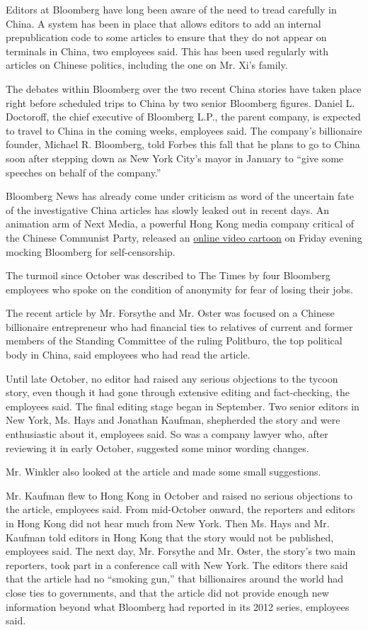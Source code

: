Editors at Bloomberg have long been aware of the need to tread carefully
in China. A system has been in place that allows editors to add an
internal prepublication code to some articles to ensure that they do not
appear on terminals in China, two employees said. This has been used
regularly with articles on Chinese politics, including the one on Mr.
Xi's family.

The debates within Bloomberg over the two recent China stories have
taken place right before scheduled trips to China by two senior
Bloomberg figures. Daniel L. Doctoroff, the chief executive of Bloomberg
L.P., the parent company, is expected to travel to China in the coming
weeks, employees said. The company's billionaire founder, Michael R.
Bloomberg, told Forbes this fall that he plans to go to China soon after
stepping down as New York City's mayor in January to ``give some
speeches on behalf of the company.''

Bloomberg News has already come under criticism as word of the uncertain
fate of the investigative China articles has slowly leaked out in recent
days. An animation arm of Next Media, a powerful Hong Kong media company
critical of the Chinese Communist Party, released an
\href{http://www.youtube.com/watch?v=DQGMLlihZ1I\&feature=youtu.be}{online
video cartoon} on Friday evening mocking Bloomberg for self-censorship.

The turmoil since October was described to The Times by four Bloomberg
employees who spoke on the condition of anonymity for fear of losing
their jobs.

The recent article by Mr. Forsythe and Mr. Oster was focused on a
Chinese billionaire entrepreneur who had financial ties to relatives of
current and former members of the Standing Committee of the ruling
Politburo, the top political body in China, said employees who had read
the article.

Until late October, no editor had raised any serious objections to the
tycoon story, even though it had gone through extensive editing and
fact-checking, the employees said. The final editing stage began in
September. Two senior editors in New York, Ms. Hays and Jonathan
Kaufman, shepherded the story and were enthusiastic about it, employees
said. So was a company lawyer who, after reviewing it in early October,
suggested some minor wording changes.

Mr. Winkler also looked at the article and made some small suggestions.

Mr. Kaufman flew to Hong Kong in October and raised no serious
objections to the article, employees said. From mid-October onward, the
reporters and editors in Hong Kong did not hear much from New York. Then
Ms. Hays and Mr. Kaufman told editors in Hong Kong that the story would
not be published, employees said. The next day, Mr. Forsythe and Mr.
Oster, the story's two main reporters, took part in a conference call
with New York. The editors there said that the article had no ``smoking
gun,'' that billionaires around the world had close ties to governments,
and that the article did not provide enough new information beyond what
Bloomberg had reported in its 2012 series, employees said.

